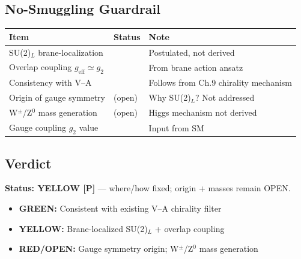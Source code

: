 \subsection{No-Smuggling Guardrail}

\begin{tcolorbox}[colback=red!5!white, colframe=red!50!black, title=Epistemic Status: SU(2)$_L$ Embedding]
\small
\begin{tabular}{lll}
\toprule
\textbf{Item} & \textbf{Status} & \textbf{Note} \\
\midrule
SU(2)$_L$ brane-localization & \tagP{} & Postulated, not derived \\
Overlap coupling $g_{\text{eff}} \simeq g_2$ & \tagP{} & From brane action ansatz \\
Consistency with V--A & \tagDc{} & Follows from Ch.9 chirality mechanism \\
Origin of gauge symmetry & (open) & Why SU(2)$_L$? Not addressed \\
W$^\pm$/Z$^0$ mass generation & (open) & Higgs mechanism not derived \\
Gauge coupling $g_2$ value & \tagBL{} & Input from SM \\
\bottomrule
\end{tabular}
\end{tcolorbox}

\subsection{Verdict}

\begin{tcolorbox}[colback=yellow!5!white, colframe=yellow!60!black,
    title=OPR-17: Minimal SU(2)$_L$ Embedding]
\textbf{Status: YELLOW [P]} --- where/how fixed; origin + masses remain OPEN.

\begin{itemize}[nosep]
    \item \textcolor{OliveGreen}{\textbf{GREEN:}} Consistent with existing V--A chirality filter \tagDc{}
    \item \textcolor{YellowOrange}{\textbf{YELLOW:}} Brane-localized SU(2)$_L$ + overlap coupling \tagP{}
    \item \textcolor{BrickRed}{\textbf{RED/OPEN:}} Gauge symmetry origin; W$^\pm$/Z$^0$ mass generation
\end{itemize}

\medskip
\noindent{}
\end{tcolorbox}

